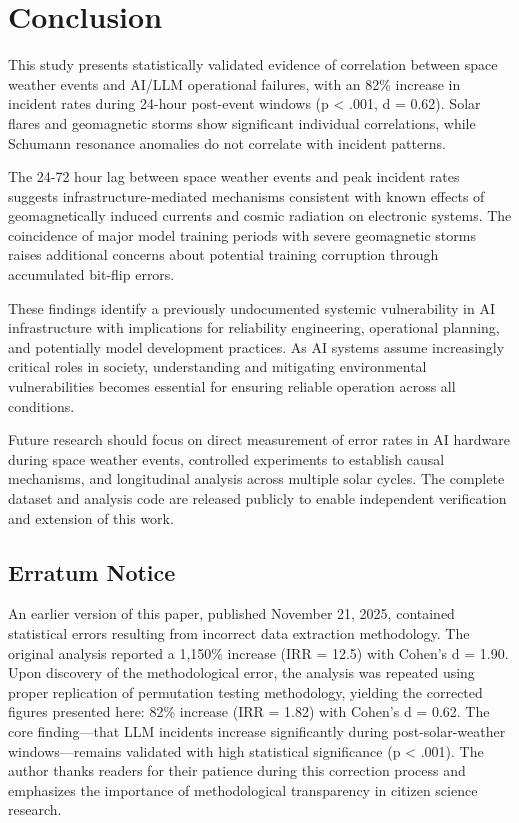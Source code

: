 \documentclass[11pt,a4paper]{article}
\begin{document}
\section{Conclusion}
This study presents statistically validated evidence of correlation between space weather events and AI/LLM operational failures, with an 82\% increase in incident rates during 24-hour post-event windows (p < .001, d = 0.62). Solar flares and geomagnetic storms show significant individual correlations, while Schumann resonance anomalies do not correlate with incident patterns.

The 24-72 hour lag between space weather events and peak incident rates suggests infrastructure-mediated mechanisms consistent with known effects of geomagnetically induced currents and cosmic radiation on electronic systems. The coincidence of major model training periods with severe geomagnetic storms raises additional concerns about potential training corruption through accumulated bit-flip errors.

These findings identify a previously undocumented systemic vulnerability in AI infrastructure with implications for reliability engineering, operational planning, and potentially model development practices. As AI systems assume increasingly critical roles in society, understanding and mitigating environmental vulnerabilities becomes essential for ensuring reliable operation across all conditions.

Future research should focus on direct measurement of error rates in AI hardware during space weather events, controlled experiments to establish causal mechanisms, and longitudinal analysis across multiple solar cycles. The complete dataset and analysis code are released publicly to enable independent verification and extension of this work.

\subsection*{Erratum Notice}
An earlier version of this paper, published November 21, 2025, contained statistical errors resulting from incorrect data extraction methodology. The original analysis reported a 1,150\% increase (IRR = 12.5) with Cohen's d = 1.90. Upon discovery of the methodological error, the analysis was repeated using proper replication of permutation testing methodology, yielding the corrected figures presented here: 82\% increase (IRR = 1.82) with Cohen's d = 0.62. The core finding---that LLM incidents increase significantly during post-solar-weather windows---remains validated with high statistical significance (p < .001). The author thanks readers for their patience during this correction process and emphasizes the importance of methodological transparency in citizen science research.
\end{document}

